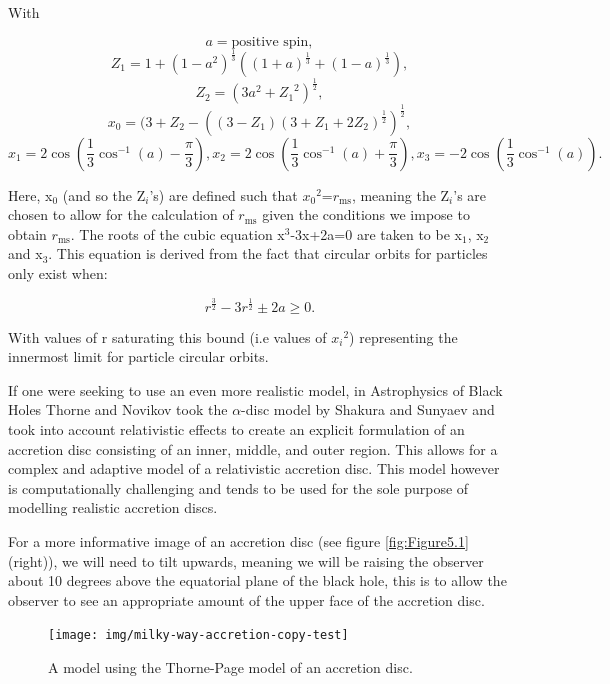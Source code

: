 \documentclass[oneside,openright,frontopenright, singlespacing]{dmathesis}
\begin{document}
\vspace{1em}
	With

	\[a = \mbox{positive spin},\]
	\[Z_1 = 1+(1-a^2)^{\frac{1}{3}}\left((1+a)^{\frac{1}{3}}+(1-a)^{\frac{1}{3}}\right),\]
	\[Z_2 = (3a^2+{Z_1}^2)^{\frac{1}{2}},\]
	\[x_0 = (3+Z_2-\left((3-Z_1)(3+Z_1+2Z_2)^{\frac{1}{2}}\right)^{\frac{1}{2}},\]
	\[x_1 = 2\cos\left(\frac{1}{3}\cos^{-1}(a)-\frac{\pi}{3}\right), x_2 =2\cos\left(\frac{1}{3}\cos^{-1}(a)+\frac{\pi}{3}\right) , x_3 = -2\cos\left(\frac{1}{3}\cos^{-1}(a)\right).\]

	 Here, x$_0$ (and so the Z$_i$'s) are defined such that ${x_0}^2$=$r_{\mbox{ms}}$, meaning the Z$_i$'s are chosen to allow for the calculation of $r_{\mbox{ms}}$ given the conditions we impose to obtain $r_{\mbox{ms}}$. The roots of the cubic equation x$^3$-3x+2a=0 are taken to be x$_1$, x$_2$ and x$_3$. This equation is derived from the fact that circular orbits for particles only exist when:

	\[r^{\frac{3}{2}}-3r^{\frac{1}{2}} \pm 2a \geq 0.\]

	With values of r saturating this bound (i.e values of ${x_i}^2$) representing the innermost limit for particle circular orbits.

\vspace{1em}
	If one were seeking to use an even more realistic model, in Astrophysics of Black Holes\cite{novikov1973astrophyics} Thorne and Novikov took the $\alpha$-disc model by Shakura and Sunyaev\cite{shakura1973black} and took into account relativistic effects to create an explicit formulation of an accretion disc consisting of an inner, middle, and outer region. This allows for a complex and adaptive model of a relativistic accretion disc. This model however is computationally challenging and tends to be used for the sole purpose of modelling realistic accretion discs.

\vspace{1em}
	For a more informative image of an accretion disc (see figure \ref{fig:Figure5.1} (right)), we will need to tilt upwards, meaning we will be raising the observer about 10 degrees above the equatorial plane of the black hole, this is to allow the observer to see an appropriate amount of the upper face of the accretion disc.

\begin{figure}[!ht]
	\centering
	\texttt{[image: img/milky-way-accretion-copy-test]}
	\caption{A model using the Thorne-Page model of an accretion disc.}
	\label{fig:Figure5.3}
\end{figure}
\end{document}
